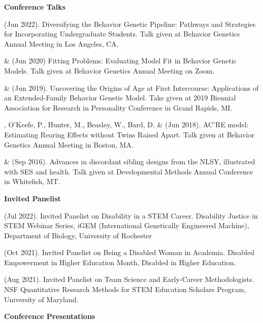 {\large {\bf Conference Talks}}\begin{etaremune}

\item \meb (Jun 2022). Diversifying the Behavior Genetic Pipeline: Pathways and Strategies for Incorporating Undergraduate Students. Talk given at Behavior Genetics Annual Meeting in Los Angeles, CA.

\item \meb \& \Joe (Jun 2020) Fitting Problems: Evaluating Model Fit in Behavior Genetic Models. Talk given at Behavior Genetics Annual Meeting on Zoom.
%
\item \meb \& \Joe (Jun 2019). Uncovering the Origins of Age at First Intercourse: Applications of an Extended-Family Behavior Genetic Model. Take given at 2019 Biennial Association for Research in Personality Conference in Grand Rapids, MI.
%
\item\meb, O'Keefe, P., Hunter, M., Beasley, W., Bard, D. \& \Joe (Jun 2018). AC'RE model: Estimating Rearing Effects without Twins Raised Apart. Talk given at Behavior Genetics Annual Meeting in Boston, MA.
%
\item\meb \& \joe (Sep 2016). Advances in discordant sibling designs from the NLSY, illustrated with SES and health. Talk given at Developmental Methods Annual Conference in Whitefish, MT.%
%
\end{etaremune}
\pagebreak
{\large \bf Invited Panelist}
\begin{etaremune}
\item \meb (Jul 2022). Invited Panelist on Disability in a STEM Career. Disability Justice in STEM Webinar Series, iGEM (International Genetically Engineered Machine), Department of Biology, University of Rochester
%
\item \meb (Oct 2021). Invited Panelist on Being a Disabled Woman in Academia. Disabled Empowerment in Higher Education Month, Disabled in Higher Education.
%
\item \meb (Aug 2021). Invited Panelist on Team Science and Early-Career Methodologists. NSF Quantitative Research Methods for STEM Education Scholars Program, University of Maryland.%
\end{etaremune}
{\large {\bf Conference Presentations}}
